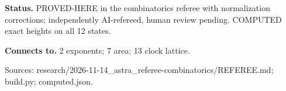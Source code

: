 \textbf{Status.} PROVED-HERE in the combinatorics referee with normalization corrections; independently AI-refereed, human review pending. COMPUTED exact heights on all 12 states.

\textbf{Connects to.} 2 exponents; 7 area; 13 clock lattice.

{\footnotesize\raggedright Sources: research/\allowbreak{}2026-11-14\_astra\_referee-combinatorics/\allowbreak{}REFEREE.md;\allowbreak{} build.py;\allowbreak{} computed.json.\par}
